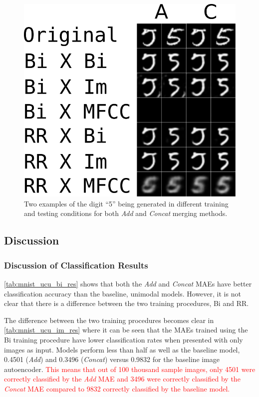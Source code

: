 \begin{figure}[h]
\begin{center}
	\includegraphics{Figs/mnistSpoken/5s.png}
	\caption{Two examples of the digit ``5'' being generated in different training and testing conditions for both \textit{Add} and \textit{Concat} merging methods.}
	\label{fig:5s}
\end{center}
\end{figure}



\subsection{Discussion}

\subsubsection{Discussion of Classification Results}
\autoref{tab:mnist_ucu_bi_res} shows that both the \textit{Add} and \textit{Concat} \acp{MAE} have better classification accuracy than the baseline, unimodal models. However, it is not clear that there is a difference between the two training procedures, Bi and RR.

The difference between the two training procedures becomes clear in \autoref{tab:mnist_ucu_im_res} where it can be seen that the \acp{MAE} trained using the Bi training procedure have lower classification rates when presented with only images as input. Models perform less than half as well as the baseline model, 0.4501 (\textit{Add}) and 0.3496 (\textit{Concat}) versus 0.9832 for the baseline image autoencoder. \textcolor{red}{This means that out of 100 thousand sample images, only 4501 were correctly classified by the \textit{Add} \ac{MAE} and 3496 were correctly classified by the \textit{Concat} \ac{MAE} compared to 9832 correctly classified by the baseline model.}

